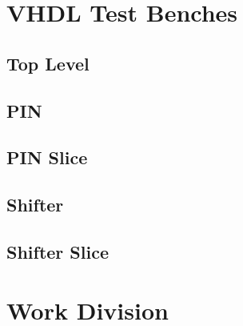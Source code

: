 \documentclass{article}
\begin{document}
\section{VHDL Test Benches}
\subsection{Top Level}
\subsection{PIN}
\subsection{PIN Slice}

\subsection{Shifter}
\subsection{Shifter Slice}


\section{Work Division}
\end{document}
